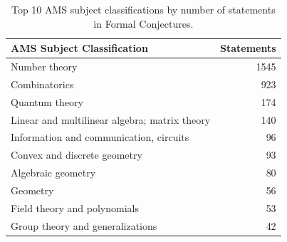 \begin{table}[h]
    \caption{Top 10 AMS subject classifications by number of statements in Formal Conjectures.}
    \label{tab:ams-breakdown}
    \centering
    \begin{tabular}{lr}
    \toprule
    \textbf{AMS Subject Classification} & \textbf{Statements} \\
    \midrule
    Number theory & 1545 \\
    Combinatorics & 923 \\
    Quantum theory & 174 \\
    Linear and multilinear algebra; matrix theory & 140 \\
    Information and communication, circuits & 96 \\
    Convex and discrete geometry & 93 \\
    Algebraic geometry & 80 \\
    Geometry & 56 \\
    Field theory and polynomials & 53 \\
    Group theory and generalizations & 42 \\
    \bottomrule
    \end{tabular}
\end{table}
